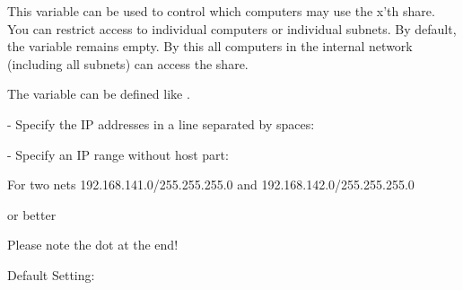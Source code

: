 \begin{description}

  This variable can be used to control which computers
  may use the x'th share. You can restrict access to
  individual computers or individual subnets.
  By default, the variable remains empty. By this
  all computers in the internal network (including all subnets)
  can access the share.

  The variable can be defined like .

  - Specify the IP addresses in a line separated by spaces:


  - Specify an IP range without host part:


  For two nets 192.168.141.0/255.255.255.0 and
  192.168.142.0/255.255.255.0

  or better


  Please note the dot at the end!

  Default Setting: 

\end{description}

